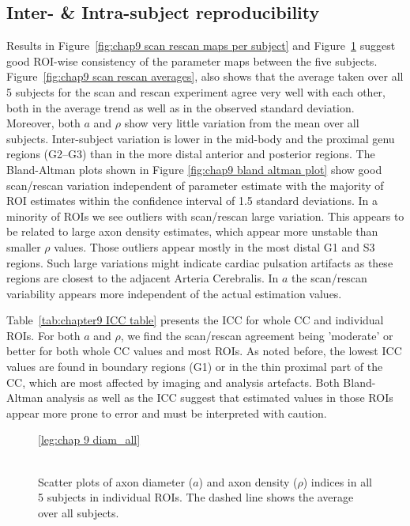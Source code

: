 \subsection*{Inter- \& Intra-subject reproducibility}
Results in Figure~\ref{fig:chap9 scan rescan maps per subject} and  Figure~\ref{fig:chap9 scan rescan scatterplots per subject} suggest good ROI-wise consistency of the parameter maps between the five subjects. Figure~\ref{fig:chap9 scan rescan averages}, also shows that the average taken over all 5 subjects for the scan and rescan experiment agree very well with each other, both in the average trend as well as in the observed standard deviation. Moreover, both $a$ and $\rho$ show very little variation from the mean over all subjects. Inter-subject variation is lower in the mid-body and the proximal genu regions (G2--G3) than in the more distal anterior and posterior regions. The Bland-Altman plots shown in Figure \ref{fig:chap9 bland altman plot} show good scan/rescan variation independent of parameter estimate with the majority of ROI estimates within the confidence interval of 1.5 standard deviations. In a minority of ROIs we see outliers with scan/rescan large variation. This appears to be related to large axon density estimates, which appear more unstable than smaller $\rho$ values. Those outliers appear mostly in the most distal G1 and S3 regions. Such large variations might indicate cardiac pulsation artifacts as these regions are closest to the adjacent Arteria Cerebralis. In $a$ the scan/rescan variability appears more independent of the actual estimation values.


Table~\ref{tab:chapter9 ICC table} presents the \gls{ICC} for whole CC and individual ROIs. For both $a$ and $\rho$, we find the scan/rescan agreement being 'moderate' or better for both whole CC values and most ROIs. As noted before, the lowest ICC values are found in boundary regions (G1) or in the thin proximal part of the CC, which are most affected by imaging and analysis artefacts. Both Bland-Altman analysis as well as the ICC suggest that estimated values in those ROIs appear more prone to error and must be interpreted with caution.

\begin{figure}[ht]
	\centering
	\ref{leg:chap 9 diam_all}
	\\	
	\\
	\caption{Scatter plots of axon diameter ($a$) and axon density ($\rho$) indices in all 5 subjects in individual ROIs. The dashed line shows the average over all subjects.}
	\label{fig:chap9 scan rescan scatterplots per subject}
\end{figure}

